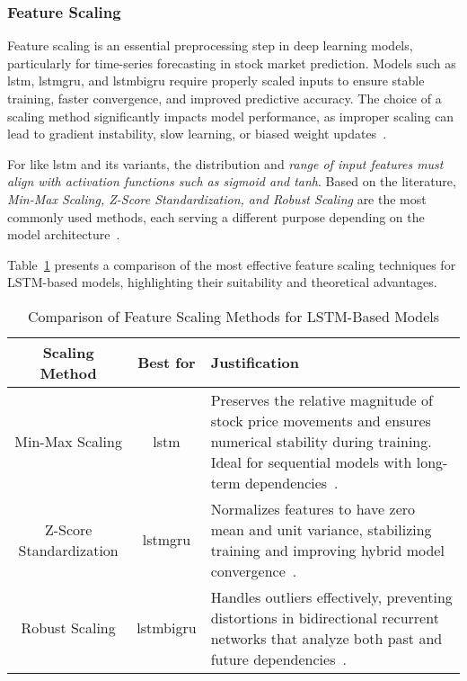 \subsubsection{Feature Scaling}

Feature scaling is an essential preprocessing step in deep learning models, particularly for
time-series forecasting in stock market prediction. Models such as \acrshort{lstm}, 
\acrshort{lstmgru}, and \acrshort{lstmbigru} require properly scaled inputs to ensure stable
training, faster convergence, and improved predictive accuracy. The choice of a scaling
method significantly impacts model performance, as improper scaling can lead to gradient
instability, slow learning, or biased weight updates~\parencite{chang2024StockPrediction}.

For  like \acrshort{lstm} and its variants, the distribution 
and \emph{range of input features must align with activation functions such as sigmoid and tanh}. Based on the literature, 
\emph{Min-Max Scaling, Z-Score Standardization, and Robust Scaling} are the most
commonly used methods, each serving a different purpose depending on the model 
architecture~\parencite{balasubramanian2023SystematicSurvey}.

Table~\ref{tab:scaling_methods} presents a comparison of the most effective feature scaling techniques for LSTM-based models, highlighting their suitability and theoretical advantages.

\begin{table}[H]
    \centering
    \caption{Comparison of Feature Scaling Methods for LSTM-Based Models}
    \label{tab:scaling_methods}
    \begin{tabular}{ccp{7.5cm}}
        \hline
        \textbf{Scaling Method} & \textbf{Best for} & \textbf{Justification} \\
        \hline\hline
        Min-Max Scaling & \acrshort{lstm} & Preserves the relative magnitude of stock price 
        movements and ensures numerical stability during training. Ideal for 
        sequential models with long-term 
        dependencies~\parencite{chang2024StockPrediction}. \\
        Z-Score Standardization & \acrshort{lstmgru} & Normalizes features to have zero mean
        and unit variance, stabilizing training and improving hybrid model 
        convergence~\parencite{balasubramanian2023SystematicSurvey}. \\
        Robust Scaling & \acrshort{lstmbigru} & Handles outliers effectively, preventing 
        distortions in bidirectional recurrent networks that analyze both past and 
        future dependencies~\parencite{shaban2024SMPDL}. \\ \hline
    \end{tabular}
\end{table}

